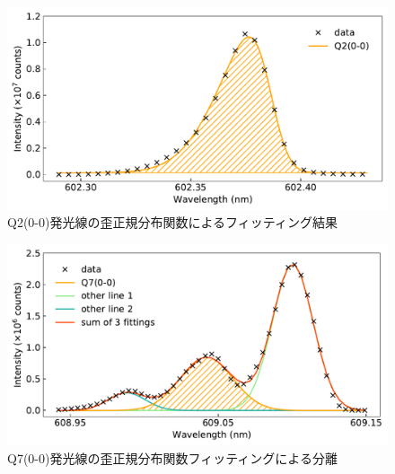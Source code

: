 \begin{figure}
    \centering
    \includegraphics[width=15cm]{pictures/skewed-gaussian-fitting-00_Q2.pdf}
    \caption{Q2(0-0)発光線の歪正規分布関数によるフィッティング結果}
    \label{fig:voigt-fitting-1}
\end{figure}

\begin{figure}
    \centering
    \includegraphics[width=15cm]{pictures/skewed-gaussian-fitting-00_Q7.pdf}
    \caption{Q7(0-0)発光線の歪正規分布関数フィッティングによる分離}
    \label{fig:voigt-fitting-2}
\end{figure}

